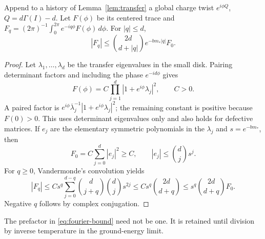\begin{lemma}
\label{lem:fourier}
Append to a history of Lemma~\ref{lem:transfer} a global
charge twist $e^{i\phi Q}$, $Q=d\Gamma(I)-d$.
Let $F(\phi)$ be its centered trace and
$F_q=(2\pi)^{-1}\int_0^{2\pi}e^{-iq\phi}F(\phi)\,d\phi$.
For $|q|\le d$,
\begin{equation}
 |F_q|\le\binom{2d}{d+|q|}e^{-bm_*|q|}F_0.
 \label{eq:fourier-bound}
\end{equation}
\end{lemma}
\begin{proof}
Let $\lambda_1,\ldots,\lambda_d$ be the transfer eigenvalues
in the small disk. Pairing determinant factors and including
the phase $e^{-id\phi}$ gives
\[
 F(\phi)=C\prod_{j=1}^d|1+e^{i\phi}\lambda_j|^2,\qquad C>0.
\]
A paired factor is
$e^{i\phi}\overline\lambda_j^{-1}
 |1+e^{i\phi}\lambda_j|^2$; the remaining constant is positive
because $F(0)>0$. This uses determinant eigenvalues only and
also holds for defective matrices.
If $e_j$ are the elementary symmetric polynomials in the
$\lambda_j$ and $s=e^{-bm_*}$, then
\[
 F_0=C\sum_{j=0}^d|e_j|^2\ge C,\qquad
 |e_j|\le\binom dj s^j.
\]
For $q\ge0$, Vandermonde's convolution yields
\[
 |F_q|\le Cs^q\sum_{j=0}^{d-q}\binom d{j+q}\binom dj s^{2j}
 \le Cs^q\binom{2d}{d+q}
 \le s^q\binom{2d}{d+q}F_0.
\]
Negative $q$ follows by complex conjugation.
\end{proof}

The prefactor in \eqref{eq:fourier-bound} need not be one.
It is retained until division by inverse temperature in the
ground-energy limit.
